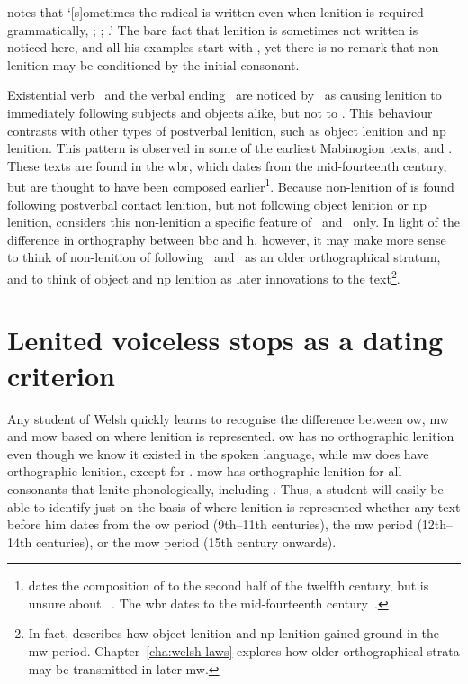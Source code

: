 \Textcite[107n]{Sim_Buchedd18} notes that `[s]ometimes the radical is written even when lenition is required grammatically, \eg {}; ; .' The bare fact that lenition is sometimes not written is noticed here, and all his examples start with , yet there is no remark that non-lenition may be conditioned by the initial consonant.

Existential verb \oes\ and the verbal ending \ei\ are noticed by~\textcite{van_development14} as causing lenition to immediately following subjects and objects alike, but not to . This behaviour contrasts with other types of postverbal lenition, such as object lenition and \gls{np} lenition. This pattern is observed in some of the earliest Mabinogion texts, \ie {} and . These texts are found in the \gls{wbr}, which dates from the mid-fourteenth century, but are thought to have been composed earlier\footnote{\Textcite[43]{rodway_date_2005} dates the composition of  to the second half of the twelfth century, but is unsure about ~\autocite[59]{Rod_Where07}. The \gls{wbr} dates to the mid-fourteenth century~\autocite[59]{huws_medieval_2000}.}. Because non-lenition of  is found following postverbal contact lenition, but not following object lenition or \gls{np} lenition, \textcite{van_development14} considers this non-lenition a specific feature of \ei\ and \oes\ only. In light of the difference in orthography between \gls{bbc} and \gls{h}, however, it may make more sense to think of non-lenition of  following \ei\ and \oes\ as an older orthographical stratum, and to think of object and \gls{np} lenition as later innovations to the text\footnote{In fact, \textcite{van_development14} describes how object lenition and \gls{np} lenition gained ground in the \gls{mw} period. Chapter~\ref{cha:welsh-laws} explores how older orthographical strata may be transmitted in later \gls{mw}.}.

\section{Lenited voiceless stops as a dating criterion}
\label{sec:lenit-voic-stops-1}
Any student of Welsh quickly learns to recognise the difference between \gls{ow}, \gls{mw} and \gls{mow} based on where lenition is represented. \Gls{ow} has no orthographic lenition even though we know it existed in the spoken language, while \gls{mw} does have orthographic lenition, except for . \Gls{mow} has orthographic lenition for all consonants that lenite phonologically, including . Thus, a student will easily be able to identify just on the basis of where lenition is represented whether any text before him dates from the \gls{ow} period (9th--11th centuries), the \gls{mw} period (12th--14th centuries), or the \gls{mow} period (15th century onwards).

